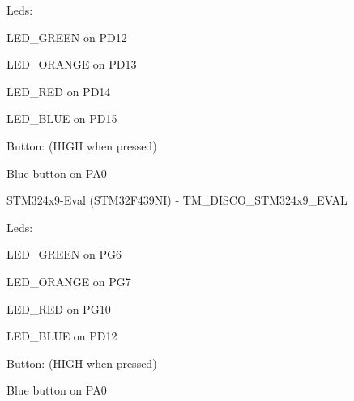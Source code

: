\begin{DoxyItemize}
\begin{DoxyItemize}
\item Leds\+:
\begin{DoxyItemize}
\item L\+E\+D\+\_\+\+G\+R\+E\+E\+N on P\+D12
\item L\+E\+D\+\_\+\+O\+R\+A\+N\+G\+E on P\+D13
\item L\+E\+D\+\_\+\+R\+E\+D on P\+D14
\item L\+E\+D\+\_\+\+B\+L\+U\+E on P\+D15
\end{DoxyItemize}
\item Button\+: (H\+I\+G\+H when pressed)
\begin{DoxyItemize}
\item Blue button on P\+A0
\end{DoxyItemize}
\end{DoxyItemize}
\item S\+T\+M324x9-\/\+Eval (S\+T\+M32\+F439\+N\+I) -\/ {\ttfamily T\+M\+\_\+\+D\+I\+S\+C\+O\+\_\+\+S\+T\+M324x9\+\_\+\+E\+V\+A\+L}
\begin{DoxyItemize}
\item Leds\+:
\begin{DoxyItemize}
\item L\+E\+D\+\_\+\+G\+R\+E\+E\+N on P\+G6
\item L\+E\+D\+\_\+\+O\+R\+A\+N\+G\+E on P\+G7
\item L\+E\+D\+\_\+\+R\+E\+D on P\+G10
\item L\+E\+D\+\_\+\+B\+L\+U\+E on P\+D12
\end{DoxyItemize}
\item Button\+: (H\+I\+G\+H when pressed)
\begin{DoxyItemize}
\item Blue button on P\+A0
\end{DoxyItemize}
\end{DoxyItemize}
\end{DoxyItemize}

